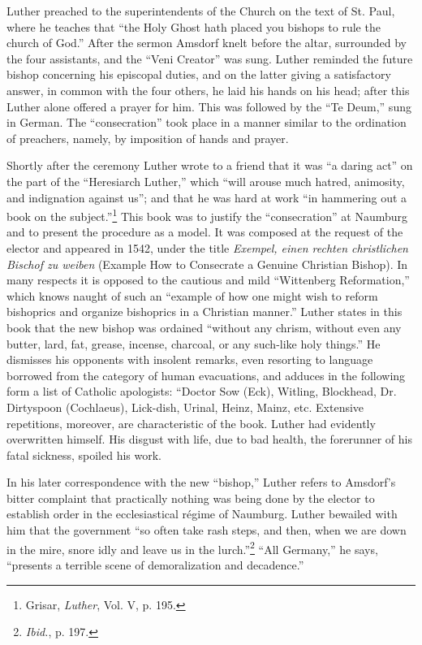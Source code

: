Luther preached to the superintendents of the Church on the text
of St. Paul, where he teaches that “the Holy Ghost hath placed you
bishops to rule the church of God.” After the sermon Amsdorf knelt
before the altar, surrounded by the four assistants, and the “Veni
Creator” was sung. Luther reminded the future bishop concerning his
episcopal duties, and on the latter giving a satisfactory answer, in
common with the four others, he laid his hands on his head; after this
Luther alone offered a prayer for him. This was followed by the “Te
Deum,” sung in German. The “consecration” took place in a manner
similar to the ordination of preachers, namely, by imposition of hands
and prayer.

Shortly after the ceremony Luther wrote to a friend that it was “a
daring act” on the part of the “Heresiarch Luther,” which “will arouse
much hatred, animosity, and indignation against us”; and that he
was hard at work “in hammering out a book on the subject.”\footnote{Grisar, \textit{Luther}, Vol. V, p. 195.}
This
book was to justify the “consecration” at Naumburg and to present
the procedure as a model. It was composed at the request of the elector
and appeared in 1542, under the title \textit{Exempel, einen rechten christlichen
Bischof zu weiben} (Example How to Consecrate a Genuine
Christian Bishop). In many respects it is opposed to the cautious and
mild “Wittenberg Reformation,” which knows naught of such an
“example of how one might wish to reform bishoprics and organize
bishoprics in a Christian manner.” Luther states in this book that the
new bishop was ordained “without any chrism, without even any
butter, lard, fat, grease, incense, charcoal, or any such-like holy
things.” He dismisses his opponents with insolent remarks, even resorting
to language borrowed from the category of human evacuations, and adduces
in the following form a list of Catholic apologists:
“Doctor Sow (Eck), Witling, Blockhead, Dr. Dirtyspoon (Cochlaeus),
Lick-dish, Urinal, Heinz, Mainz, etc. Extensive repetitions,
moreover, are characteristic of the book. Luther had evidently overwritten
himself. His disgust with life, due to bad health, the forerunner of his
fatal sickness, spoiled his work.

In his later correspondence with the new “bishop,” Luther refers to
Amsdorf’s bitter complaint that practically nothing was being done by the
elector to establish order in the ecclesiastical régime of Naumburg. Luther
bewailed with him that the government “so often take rash steps, and then,
when we are down in the mire, snore idly and leave us in the lurch.”\footnote{\textit{Ibid.}, p. 197.}
“All
Germany,” he says, “presents a terrible scene of demoralization and decadence.”

